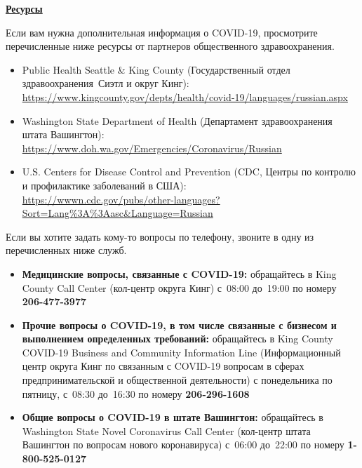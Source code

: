 \documentclass[10pt]{article}
\begin{document}
\bigskip

\large \underline{\textbf{Ресурсы}}

Если вам нужна дополнительная информация о COVID-19, просмотрите перечисленные
ниже ресурсы от партнеров общественного здравоохранения.

\begin{itemize}
\item
  Public Health \textemdash Seattle \& King County (Государственный отдел
  здравоохранения \textemdash Сиэтл и округ Кинг): \\
  \url{https://www.kingcounty.gov/depts/health/covid-19/languages/russian.aspx}

\item

  Washington State Department of Health (Департамент здравоохранения штата Вашингтон):\\
  \url{https://www.doh.wa.gov/Emergencies/Coronavirus/Russian}

\item
  U.S. Centers for Disease Control and Prevention (CDC, Центры по контролю и
  профилактике заболеваний в США):\\
  \url{https://wwwn.cdc.gov/pubs/other-languages?Sort=Lang%3A%3Aasc&Language=Russian}

\end{itemize}

Если вы хотите задать кому-то вопросы по телефону, звоните в одну из
перечисленных ниже служб.

\begin{itemize}

\item

  \textbf{Медицинские вопросы, связанные с COVID-19:} обращайтесь в King County
  Call Center (кол-центр округа Кинг) с 08:00 до 19:00 по номеру
  \textbf{206-477-3977}

\item

  \textbf{Прочие вопросы о COVID-19, в том числе связанные с бизнесом и
  выполнением определенных требований:} обращайтесь в King County COVID-19
  Business and Community Information Line (Информационный центр округа Кинг по
  связанным с COVID-19 вопросам в сферах предпринимательской и общественной
  деятельности) с понедельника по пятницу, с 08:30 до 16:30 по номеру
  \textbf{206-296-1608}

\item

  \textbf{Общие вопросы о COVID-19 в штате Вашингтон:} обращайтесь в Washington
  State Novel Coronavirus Call Center (кол-центр штата Вашингтон по вопросам
  нового коронавируса) с 06:00 до 22:00 по номеру \textbf{1-800-525-0127}

\end{itemize}
\end{document}
